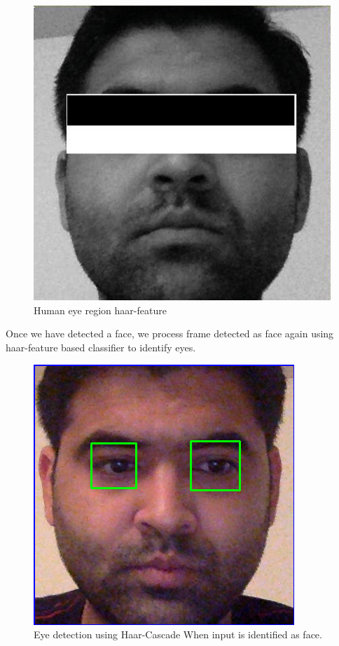 \documentclass[10pt,twocolumn,letterpaper]{article}
\begin{document}
\begin{figure}
  \begin{center}
    \includegraphics[width=\linewidth]{eyes}
  \end{center}
  \caption{Human eye region haar-feature}
  \label{fig:human_eyes}
\end{figure}


Once we have detected a face, we process frame detected 
as face again using haar-feature based classifier to identify eyes. 

\begin{figure}
  \begin{center}
    \includegraphics[width=\linewidth]{eyes_detected}
  \end{center}
  \caption{Eye detection using Haar-Cascade When input is identified as face.}
  \label{fig:eyes_detected}
\end{figure}
\end{document}
